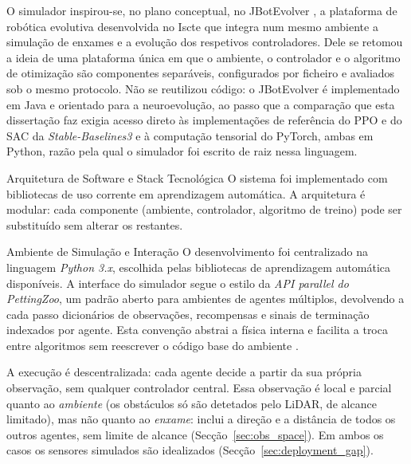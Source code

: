 \documentclass[12pt,reqno, twoside]{amsbook}
\makeatletter
\def\section{\@startsection{section}{1}%
      \z@{.5\linespacing\@plus.7\linespacing}{.25\linespacing}%
      {\normalfont\bfseries\flushleft}}
\def\subsection{\@startsection{subsection}{2}%
      \z@{.5\linespacing\@plus.7\linespacing}{.25\linespacing}%
      {\normalfont\bfseries\flushleft}}
\theoremstyle{plain}
\numberwithin{equation}{chapter}
\numberwithin{section}{chapter}
\numberwithin{table}{chapter}
\numberwithin{figure}{chapter}
\makeatother
\begin{document}
O simulador inspirou-se, no plano conceptual, no JBotEvolver \cite{duarte2014jbotevolver}, a plataforma de robótica evolutiva desenvolvida no Iscte que integra num mesmo ambiente a simulação de enxames e a evolução dos respetivos controladores. Dele se retomou a ideia de uma plataforma única em que o ambiente, o controlador e o algoritmo de otimização são componentes separáveis, configurados por ficheiro e avaliados sob o mesmo protocolo. Não se reutilizou código: o JBotEvolver é implementado em Java e orientado para a neuroevolução, ao passo que a comparação que esta dissertação faz exigia acesso direto às implementações de referência do PPO e do SAC da \textit{Stable-Baselines3} e à computação tensorial do PyTorch, ambas em Python, razão pela qual o simulador foi escrito de raiz nessa linguagem.

\section{Arquitetura de Software e Stack Tecnológica}
O sistema foi implementado com bibliotecas de uso corrente em aprendizagem automática. A arquitetura é modular: cada componente (ambiente, controlador, algoritmo de treino) pode ser substituído sem alterar os restantes.

\subsection{Ambiente de Simulação e Interação}
O desenvolvimento foi centralizado na linguagem \emph{Python 3.x}, escolhida pelas bibliotecas de aprendizagem automática disponíveis. A interface do simulador segue o estilo da \emph{API \emph{parallel} do PettingZoo}, um padrão aberto para ambientes de agentes múltiplos, devolvendo a cada passo dicionários de observações, recompensas e sinais de terminação indexados por agente. Esta convenção abstrai a física interna e facilita a troca entre algoritmos sem reescrever o código base do ambiente \cite{bettini2024benchmarl}.

A execução é descentralizada: cada agente decide a partir da sua própria observação, sem qualquer controlador central. Essa observação é local e parcial quanto ao \emph{ambiente} (os obstáculos só são detetados pelo LiDAR, de alcance limitado), mas não quanto ao \emph{enxame}: inclui a direção e a distância de todos os outros agentes, sem limite de alcance (Secção~\ref{sec:obs_space}). Em ambos os casos os sensores simulados são idealizados (Secção~\ref{sec:deployment_gap}).
\end{document}

